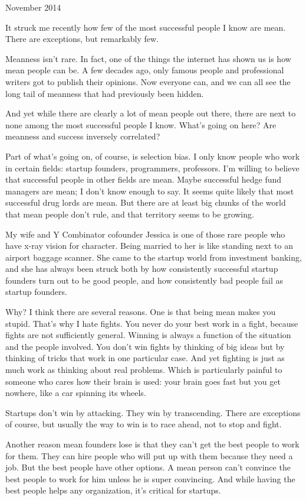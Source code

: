 November 2014

It struck me recently how few of the most successful people I know are
mean. There are exceptions, but remarkably few.

Meanness isn't rare. In fact, one of the things the internet has shown
us is how mean people can be. A few decades ago, only famous people and
professional writers got to publish their opinions. Now everyone can,
and we can all see the long tail of meanness that had previously been
hidden.

And yet while there are clearly a lot of mean people out there, there
are next to none among the most successful people I know. What's going
on here? Are meanness and success inversely correlated?

Part of what's going on, of course, is selection bias. I only know
people who work in certain fields: startup founders, programmers,
professors. I'm willing to believe that successful people in other
fields are mean. Maybe successful hedge fund managers are mean; I don't
know enough to say. It seems quite likely that most successful drug
lords are mean. But there are at least big chunks of the world that mean
people don't rule, and that territory seems to be growing.

My wife and Y Combinator cofounder Jessica is one of those rare people
who have x-ray vision for character. Being married to her is like
standing next to an airport baggage scanner. She came to the startup
world from investment banking, and she has always been struck both by
how consistently successful startup founders turn out to be good people,
and how consistently bad people fail as startup founders.

Why? I think there are several reasons. One is that being mean makes you
stupid. That's why I hate fights. You never do your best work in a
fight, because fights are not sufficiently general. Winning is always a
function of the situation and the people involved. You don't win fights
by thinking of big ideas but by thinking of tricks that work in one
particular case. And yet fighting is just as much work as thinking about
real problems. Which is particularly painful to someone who cares how
their brain is used: your brain goes fast but you get nowhere, like a
car spinning its wheels.

Startups don't win by attacking. They win by transcending. There are
exceptions of course, but usually the way to win is to race ahead, not
to stop and fight.

Another reason mean founders lose is that they can't get the best people
to work for them. They can hire people who will put up with them because
they need a job. But the best people have other options. A mean person
can't convince the best people to work for him unless he is super
convincing. And while having the best people helps any organization,
it's critical for startups.

